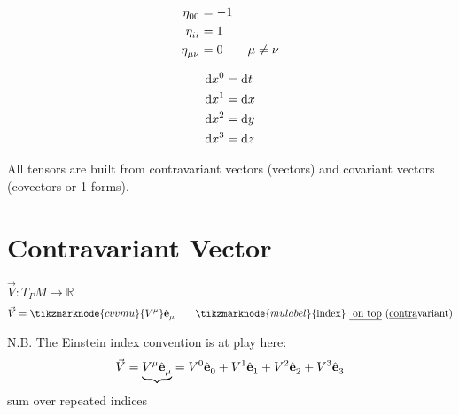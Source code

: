 \documentclass{article}
\begin{document}
\begin{align*}
    \tensor{\eta}{_0_0} &= -1 \\
    \tensor{\eta}{_i_i} &= 1 \\
    \tensor{\eta}{_\mu_\nu} &= 0 \qquad \mu \neq \nu \\
\end{align*}

\vspace{-48pt} \begin{align*}
    \mathrm{d}\tensor{x}{^0} &= \mathrm{d}t \\
    \mathrm{d}\tensor{x}{^1} &= \mathrm{d}x \\
    \mathrm{d}\tensor{x}{^2} &= \mathrm{d}y \\
    \mathrm{d}\tensor{x}{^3} &= \mathrm{d}z
\end{align*}

\noindent All tensors are built from contravariant vectors (vectors) and covariant vectors (covectors or 1-forms).

\section*{Contravariant Vector}
$\vec{V} : T_P M \rightarrow \mathbb{R}$
\begin{equation*}
    \vec{V} = \tikzmarknode{cvvmu}{\tensor{V}{^\mu}} \tensor{\hat{\mathbf{e}}}{_\mu} \qquad \tikzmarknode{mulabel}{\text{index}} \text{ \underline{ on top} (\underline{contra}variant)} 
\end{equation*}


\noindent N.B. The Einstein index convention is at play here:
\begin{equation*}
    \vec{V} = \underbrace{ \tensor{V}{^\mu} \tensor{\hat{\mathbf{e}}}{_\mu} } = \tensor{V}{^0} \tensor{\hat{\mathbf{e}}}{_0} + \tensor{V}{^1} \tensor{\hat{\mathbf{e}}}{_1} + \tensor{V}{^2} \tensor{\hat{\mathbf{e}}}{_2} + \tensor{V}{^3} \tensor{\hat{\mathbf{e}}}{_3}
\end{equation*}
\hspace{2.2in} sum over repeated indices
\end{document}
